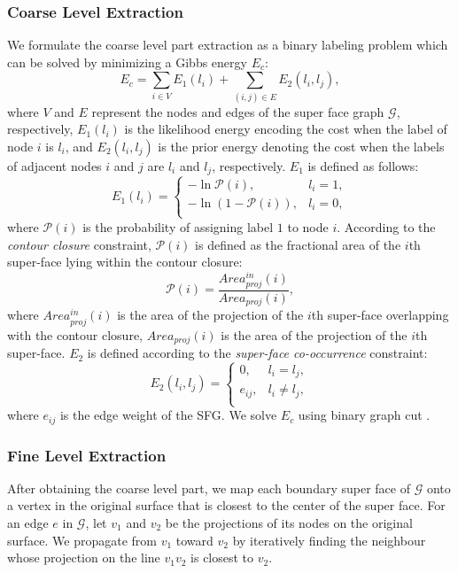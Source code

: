 \subsubsection{Coarse Level Extraction}
We formulate the coarse level part extraction as a binary labeling problem which can be solved by minimizing a Gibbs energy $E_{c}$:
\[E_{c} = \sum\limits_{{i} \in V} {{E_{1}}\left( {{l_{i}}} \right)}  + \sum\limits_{\left( {i,j} \right) \in E} {{E_{2}}\left( {{l_{i}},{l_{j}}} \right)} ,\]
where $V$ and $E$ represent the nodes and edges of the super face graph $\mathcal{G}$, respectively, $E_{1}(l_{i})$ is the likelihood energy encoding the cost when the label of node $i$ is $l_{i}$, and ${E_{2}}\left( {{l_{i}},{l_{j}}} \right)$ is the prior energy denoting the cost when the labels of adjacent nodes $i$ and $j$ are $l_{i}$ and $l_{j}$, respectively. $E_1$ is defined as follows:
\[{E_1}\left( {{l_i}} \right) = \left\{ {\begin{array}{*{20}{c}}
   { - \ln {\mathcal{P}}\left( i \right),} & {{l_i} = 1,}  \\
   { - \ln \left( {1 - {\mathcal{P}}\left( i \right)} \right),} & {{l_i} = 0,}  \\
\end{array}} \right.\]
where $\mathcal{P} \left( i \right)$ is the probability of assigning label $1$ to node $i$. According to the {\em contour closure} constraint, $\mathcal{P}(i)$ is defined as the fractional area of the $i$th super-face lying within the contour closure:
\[{\mathcal{P}}\left( i \right) = \frac{{Area_{proj}^{in}\left( i \right)}}{{Are{a_{proj}}\left( i \right)}},\]
where $Area_{proj}^{in} \left( i \right)$ is the area of the projection of the $i$th super-face overlapping with the contour closure, $Area_{proj} \left( i \right)$ is the area of the projection of the $i$th super-face. $E_2$ is defined according to the {\em super-face co-occurrence} constraint:
\[{E_2}\left( {{l_i},{l_j}} \right) = \left\{ {\begin{array}{*{20}{c}}
   {0,} & {{l_i} = {l_j},}  \\
   {{e_{ij}},} & {{l_i} \ne {l_j},}  \\
\end{array}} \right.\]
where $e_{ij}$ is the edge weight of the SFG. We solve $E_{c}$ using binary graph cut \cite{anexperimentalcomparisonboykovpami2004}.
\subsubsection{Fine Level Extraction}
\label{sec:finelevelextraction}
After obtaining the coarse level part, we map each boundary super face of $\mathcal{G}$ onto a vertex in the original surface that is closest to the center of the super face. For an edge $e$ in $\mathcal{G}$, let $v_{1}$ and $v_{2}$ be the projections of its nodes on the original surface. We propagate from $v_{1}$ toward $v_{2}$ by iteratively finding the neighbour whose projection on the line $v_{1}v_{2}$ is closest to $v_{2}$.

